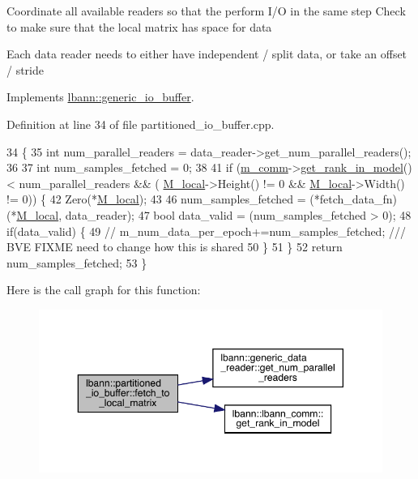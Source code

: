 Coordinate all available readers so that the perform I/O in the same step Check to make sure that the local matrix has space for data

Each data reader needs to either have independent / split data, or take an offset / stride 

Implements \hyperlink{classlbann_1_1generic__io__buffer_af9fc2100d41328fe399acf7bced950d7}{lbann\+::generic\+\_\+io\+\_\+buffer}.



Definition at line 34 of file partitioned\+\_\+io\+\_\+buffer.\+cpp.


\begin{DoxyCode}
34                                                                                                            
      \{
35   \textcolor{keywordtype}{int} num\_parallel\_readers = data\_reader->get\_num\_parallel\_readers();
36 
37   \textcolor{keywordtype}{int} num\_samples\_fetched = 0;
38 
41   \textcolor{keywordflow}{if} (\hyperlink{classlbann_1_1generic__io__buffer_a2e4a46c85c8b30e10b1cc5acaa2c4cca}{m\_comm}->\hyperlink{classlbann_1_1lbann__comm_a789453454468a3b70de768537c50ca52}{get\_rank\_in\_model}() < num\_parallel\_readers && (
      \hyperlink{classlbann_1_1partitioned__io__buffer_a80d8916c269b26e605637353abe322b2}{M\_local}->Height() != 0 && \hyperlink{classlbann_1_1partitioned__io__buffer_a80d8916c269b26e605637353abe322b2}{M\_local}->Width() != 0)) \{
42     Zero(*\hyperlink{classlbann_1_1partitioned__io__buffer_a80d8916c269b26e605637353abe322b2}{M\_local});
43 
46     num\_samples\_fetched = (*fetch\_data\_fn)(*\hyperlink{classlbann_1_1partitioned__io__buffer_a80d8916c269b26e605637353abe322b2}{M\_local}, data\_reader);
47     \textcolor{keywordtype}{bool} data\_valid = (num\_samples\_fetched > 0);
48     \textcolor{keywordflow}{if}(data\_valid) \{
49       \textcolor{comment}{//      m\_num\_data\_per\_epoch+=num\_samples\_fetched; /// BVE FIXME need to change how this is shared}
50     \}
51   \}
52   \textcolor{keywordflow}{return} num\_samples\_fetched;
53 \}
\end{DoxyCode}
Here is the call graph for this function\+:\nopagebreak
\begin{figure}[H]
\begin{center}
\leavevmode
\includegraphics[width=350pt]{classlbann_1_1partitioned__io__buffer_a777719c9cebe912dc4c005e2c78d77c8_cgraph}
\end{center}
\end{figure}
